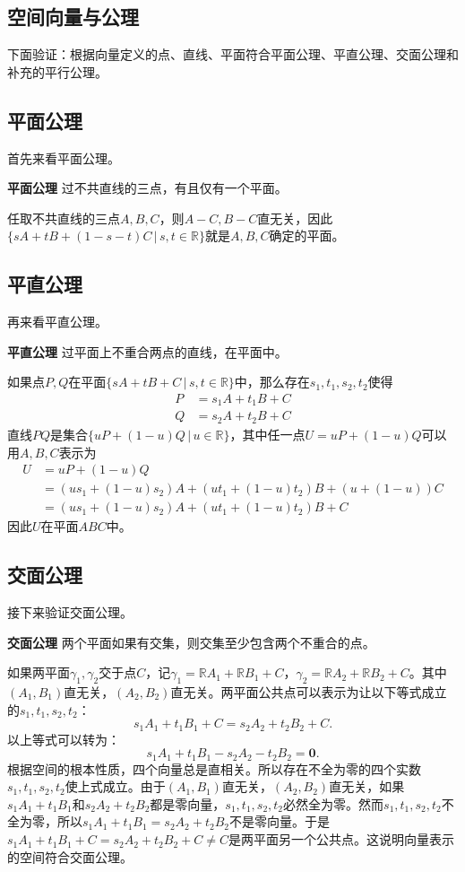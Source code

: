 \documentclass[12pt,UTF8]{ctexbook}
\begin{document}
\begin{appendix}
\chapter{空间向量与公理}

下面验证：根据向量定义的点、直线、平面符合平面公理、平直公理、交面公理和补充的平行公理。

\section{平面公理}
首先来看平面公理。
\begin{po}{\textbf{平面公理}}
    过不共直线的三点，有且仅有一个平面。
\end{po}
任取不共直线的三点$A,B,C$，则$A-C,B-C$直无关，因此$ \{sA+tB+(1 - s - t)C \, | \,s, t\in\mathbb{R}\}$就是$A,B,C$确定的平面。

\section{平直公理}
再来看平直公理。
\begin{po}{\textbf{平直公理}}
    过平面上不重合两点的直线，在平面中。
\end{po}
如果点$P,Q$在平面$ \{sA+tB+C \, | \, s,t\in\mathbb{R}\}$中，那么存在$s_1, t_1, s_2, t_2$使得
\begin{align*}
P &= s_1A + t_1B + C  \\
Q &= s_2A + t_2B + C  
\end{align*}
直线$PQ$是集合$\{uP+(1-u)Q \, | \, u\in \mathbb{R}\}$，其中任一点$U = uP+(1-u)Q$可以用$A,B,C$表示为
\begin{align*}
U &= uP+(1-u)Q  \\
&= (us_1 + (1-u)s_2)A + (ut_1 + (1-u)t_2)B + (u + (1-u))C   \\
&= (us_1 + (1-u)s_2)A + (ut_1 + (1-u)t_2)B + C 
\end{align*}
因此$U$在平面$ABC$中。

\section{交面公理}
接下来验证交面公理。
\begin{po}{\textbf{交面公理}}
    两个平面如果有交集，则交集至少包含两个不重合的点。
\end{po}
如果两平面$\gamma_1, \gamma_2$交于点$C$，记$\gamma_1 = \mathbb{R}A_1+\mathbb{R}B_1+C$，$\gamma_2 = \mathbb{R}A_2+\mathbb{R}B_2+C$。其中$(A_1,B_1)$直无关，$(A_2,B_2)$直无关。两平面公共点可以表示为让以下等式成立的$s_1,t_1,s_2,t_2$：
$$ s_1A_1+t_1B_1+C = s_2A_2+t_2B_2+C. $$
以上等式可以转为：
$$ s_1A_1+t_1B_1 - s_2A_2 - t_2B_2 = \mathbf{0}. $$
根据空间的根本性质，四个向量总是直相关。所以存在不全为零的四个实数$s_1,t_1,s_2,t_2$使上式成立。由于$(A_1,B_1)$直无关，$(A_2,B_2)$直无关，如果$s_1A_1+t_1B_1$和$s_2A_2 + t_2B_2$都是零向量，$s_1,t_1,s_2,t_2$必然全为零。然而$s_1,t_1,s_2,t_2$不全为零，所以$s_1A_1+t_1B_1 =s_2A_2 + t_2B_2$不是零向量。于是$s_1A_1+t_1B_1+C = s_2A_2+t_2B_2+C\neq C$是两平面另一个公共点。这说明向量表示的空间符合交面公理。


\end{appendix}
\end{document}
